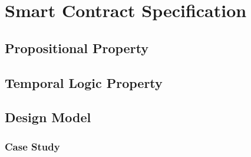 \chapter{Smart Contract Specification}
\section{Propositional Property}
\section{Temporal Logic Property}
\section{Design Model}
\subsection{Case Study}